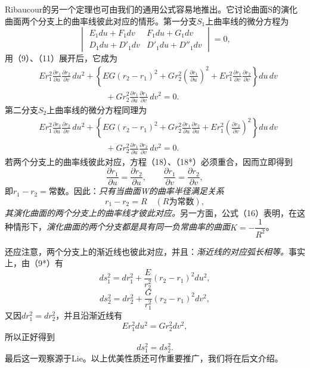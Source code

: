 Ribaucour的另一个定理也可由我们的通用公式容易地推出。它讨论曲面S的演化曲面两个分支上的曲率线彼此对应的情形。第一分支\(S_1\)上曲率线的微分方程为
\[
 \begin{vmatrix}
 E_1du+F_1dv & F_1du+G_1dv\\
 D_1du+D'_1dv & D'_1du+D''_1dv
 \end{vmatrix}=0,
\]
用（9）、（11）展开后，它成为
\begin{equation}\tag{18}
\begin{aligned}
&Er_1^2\frac{\partial r_1}{\partial u}\frac{\partial r_2}{\partial v}\,du^2
+\left\{EG(r_2-r_1)^2+Gr_2^2\left(\frac{\partial r_1}{\partial u}\right)^2+Er_1^2\frac{\partial r_1}{\partial v}\frac{\partial r_2}{\partial v}\right\}du\,dv \\
&\hspace{8em}+Gr_2^2\frac{\partial r_1}{\partial u}\frac{\partial r_1}{\partial v}\,dv^2=0.
\end{aligned}
\end{equation}
第二分支\(S_2\)上曲率线的微分方程同理为
\begin{equation}\tag{18*}
\begin{aligned}
&Er_1^2\frac{\partial r_2}{\partial u}\frac{\partial r_2}{\partial v}\,du^2
+\left\{EG(r_2-r_1)^2+Gr_2^2\frac{\partial r_1}{\partial u}\frac{\partial r_2}{\partial u}+Er_1^2\left(\frac{\partial r_2}{\partial v}\right)^2\right\}du\,dv \\
&\hspace{8em}+Gr_2^2\frac{\partial r_1}{\partial u}\frac{\partial r_2}{\partial v}\,dv^2=0.
\end{aligned}
\end{equation}
若两个分支上的曲率线彼此对应，方程（18）、（18*）必须重合，因而立即得到
\[
 \frac{\partial r_1}{\partial u}=\frac{\partial r_2}{\partial u},
 \qquad
 \frac{\partial r_1}{\partial v}=\frac{\partial r_2}{\partial v},
\]
即\(r_1-r_2=\)常数。因此：\emph{只有当曲面W的曲率半径满足关系}
\[
 r_1-r_2=R\quad(R\text{为常数}),
\]
\emph{其演化曲面的两个分支上的曲率线才彼此对应。}另一方面，公式（16）表明，在这种情形下，\emph{演化曲面的两个分支都是具有同一负常曲率的曲面}\(K=-\dfrac1{R^2}\)。

还应注意，两个分支上的渐近线也彼此对应，并且：\emph{渐近线的对应弧长相等。}事实上，由（9*）有
\[
 ds_1^2=dr_1^2+\frac E{r_2^2}(r_2-r_1)^2du^2,
\]
\[
 ds_2^2=dr_2^2+\frac G{r_1^2}(r_2-r_1)^2dv^2,
\]
又因\(dr_1^2=dr_2^2\)，并且沿渐近线有
\[
 Er_1^2du^2=Gr_2^2dv^2,
\]
所以正好得到
\[
 ds_1^2=ds_2^2.
\]
最后这一观察源于Lie。以上优美性质还可作重要推广，我们将在后文介绍。

